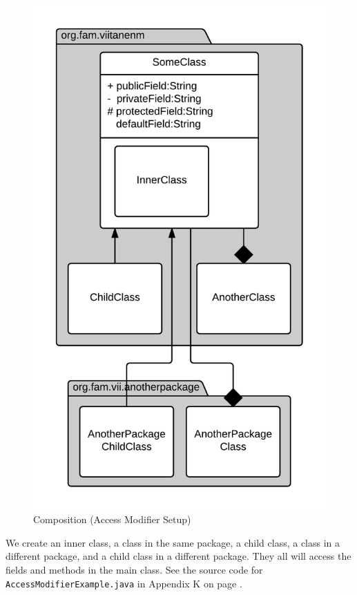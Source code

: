 \begin{figure}[!h]\centering %
\includegraphics[width=0.9\linewidth, frame]{images/accessmodifiers}
\caption{Composition (Access Modifier Setup)}
\label{fig:accessmodifiers}
\end{figure}

We create an inner class, a class in the same package, a child class, a class in a different package, and a child class in a different package. They all will access the fields and methods in the main class. See the source code for \texttt{AccessModifierExample.java} in Appendix K on page \pageref{App:AppendixK}.

